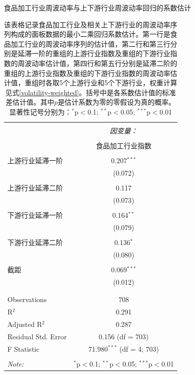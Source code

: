 \documentclass{sysuthesis}
\begin{document}
\begin{table}[!htbp] \centering 
  \caption{食品加工行业周波动率与上下游行业周波动率回归的系数估计} 
  \caption*{\footnotesize 该表格记录食品加工行业及相关上下游行业的周波动率序列构成的面板数据的最小二乘回归系数估计。第一行是食品加工行业的周波动率序列的估计值，第二行和第三行分别是延滞一阶的重组的上游行业指数及重组的下游行业指数的周波动率估计值，第四行和第五行分别是延滞二阶的重组的上游行业指数及重组的下游行业指数的周波动率估计值，重组时各取5个上游行业和5个下游行业，权重计算见式\ref{volatility-weighted}。括号中是各系数估计值的标准差估计值。其中$p$是估计系数为零的零假设为真的概率。显著性记号分别为：{$^{*}$p$<$0.1; $^{**}$p$<$0.05; $^{***}$p$<$0.01}} 
  \label{883111-vol-lease-square-estimation-second-order} 
  \renewcommand{\arraystretch}{0.5}
\begin{tabular}{@{\extracolsep{5pt}}lc} 
\\[-1.8ex]\hline 
\hline \\[-1.8ex] 
 & \multicolumn{1}{c}{\textit{因变量：}} \\ 
\cline{2-2} 
\\[-1.8ex] & 食品加工行业指数 \\ 
\hline \\[-1.8ex] 
 上游行业延滞一阶 & 0.207$^{***}$ \\ 
  & (0.072) \\ 
  & \\ 
 上游行业延滞二阶 & 0.117 \\ 
  & (0.073) \\ 
  & \\ 
 下游行业延滞一阶 & 0.164$^{**}$ \\ 
  & (0.079) \\ 
  & \\ 
 下游行业延滞二阶 & 0.136$^{*}$ \\ 
  & (0.080) \\ 
  & \\ 
 截距 & 0.069$^{***}$ \\ 
  & (0.012) \\ 
  & \\ 
\hline \\[-1.8ex] 
Observations & 708 \\ 
R$^{2}$ & 0.291 \\ 
Adjusted R$^{2}$ & 0.287 \\ 
Residual Std. Error & 0.156 (df = 703) \\ 
F Statistic & 71.980$^{***}$ (df = 4; 703) \\ 
\hline 
\hline \\[-1.8ex] 
\textit{Note:}  & \multicolumn{1}{r}{$^{*}$p$<$0.1; $^{**}$p$<$0.05; $^{***}$p$<$0.01} \\ 
\end{tabular} 
\end{table} 
\end{document}
